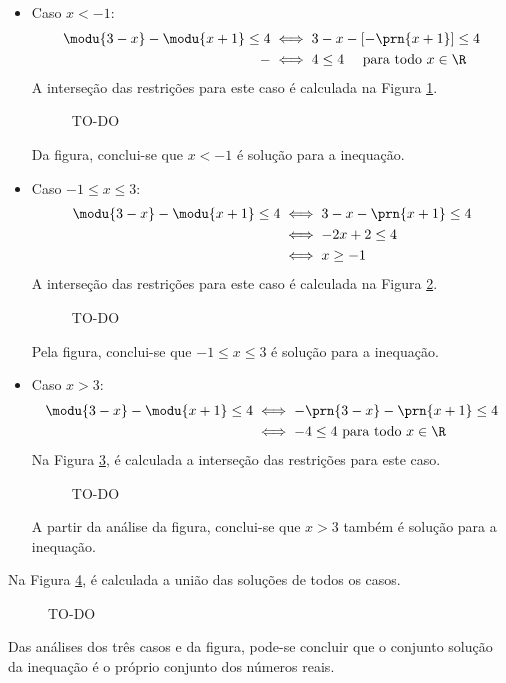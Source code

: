 \begin{solution}
\begin{enumerate}[(a)]
	\begin{itemize}
		\item Caso $x<-1$:
		\begin{align*}
			\modu{3-x}-\modu{x+1}\le4 & \iff 3-x-\left[-\prn{x+1}\right]\le 4\\
				-					  & \iff 4 \le 4 \ \ \ \ \text{para todo } x \in \R
		\end{align*}
		A interseção das restrições para este caso é calculada na Figura \ref{fig:08-28-cut1}.
		\begin{figure}[H]
		\caption{TO-DO}
		\label{fig:08-28-cut1} %
		\centering
		\end{figure}
		Da figura, conclui-se que $x<-1$ é solução para a inequação.
		\item Caso $-1 \le x \le 3$:
		\begin{align*}
		\modu{3-x} - \modu{x+1} \le 4 & \iff 3-x-\prn{x+1} \le 4 \\
		& \iff -2x+2\le 4\\ 
		& \iff x \ge -1
		\end{align*}
		A interseção das restrições para este caso é calculada na Figura \ref{fig:08-28-cut2}.
		\begin{figure}[H]
		\caption{TO-DO}
		\label{fig:08-28-cut2} 
		\centering
		\end{figure}
		Pela figura, conclui-se que $-1 \le x \le 3$ é solução para a inequação.
		\item Caso $x > 3$:
		\begin{align*}
		\modu{3-x} - \modu{x+1} \le 4 & \iff -\prn{3-x}-\prn{x+1} \le 4 \\
		& \iff -4\le 4 \text{ para todo }x \in \R
		\end{align*}
		Na Figura \ref{fig:08-28-cut3}, é calculada a interseção das restrições para este caso.
		\begin{figure}[H]
		\caption{TO-DO}
		\label{fig:08-28-cut3} 
		\centering
		\end{figure}
		A partir da análise da figura, conclui-se que $x>3$ também é solução para a inequação.
	\end{itemize}
\end{enumerate}
%
Na Figura \ref{fig:08-28-cut4}, é calculada a união das soluções de todos os casos.
%
\begin{figure}[H]
\caption{TO-DO}
\label{fig:08-28-cut4} 
\centering
\end{figure}
%
Das análises dos três casos e da figura, pode-se concluir que o conjunto solução da inequação é o próprio conjunto dos números reais.
\end{solution}